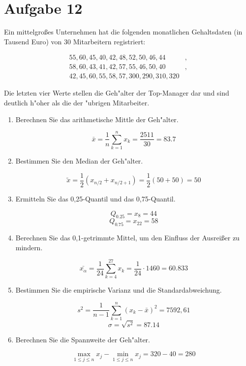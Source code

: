 \section{Aufgabe 12}
\setcounter{section}{12}

Ein mittelgroßes Unternehmen hat die folgenden monatlichen Gehaltsdaten (in
Tausend Euro) von 30 Mitarbeitern registriert:

\begin{align*}
        55, 60, 45, 40, 42, 48, 52, 50, 46, 44&,\\
        58, 60, 43, 41, 42, 57, 55, 46, 50, 40&,\\
    42, 45, 60, 55, 58, 57, 300, 290, 310, 320&
\end{align*}

Die letzten vier Werte stellen die Geh"alter der Top-Manager dar und sind
deutlich h"oher als die der "ubrigen Mitarbeiter.

\begin{enumerate}[1.]
    \item Berechnen Sie das arithmetische Mittle der Geh"alter.

        $$\bar{x} = \dfrac{1}{n}\sum_{k=1}^nx_k = \dfrac{2511}{30} = 83.7$$

    \item Bestimmen Sie den Median der Geh"alter.

        $$\widetilde{x} = \dfrac{1}{2}(x_{n/2} + x_{n/2 + 1}) = \dfrac{1}{2}(50 + 50) = 50$$

    \item Ermitteln Sie das 0,25-Quantil und das 0,75-Quantil.

        $$Q_{0.25} = x_8 = 44$$
        $$Q_{0.75} = x_{22} = 58$$

    \item Berechnen Sie das 0,1-getrimmte Mittel, um den Einfluss der Ausreißer
        zu mindern.

        $$\bar{x_{\alpha}} = \dfrac{1}{24}\sum_{k = 4}^{27}x_k = \dfrac{1}{24} \cdot 1460 = 60.833$$

    \item Bestimmen Sie die empirische Varianz und die Standardabweichung.

        $$s^2 = \dfrac{1}{n - 1}\sum_{k=1}^n(x_k - \bar{x})^2 = 7592,61$$
        $$\sigma = \sqrt{s^2} = 87.14$$

    \item Berechnen Sie die Spannweite der Geh"alter.

        $$\max_{1 \leq j \leq n}x_j - \min_{1 \leq j \leq n}x_j = 320 - 40 = 280$$

\end{enumerate}
